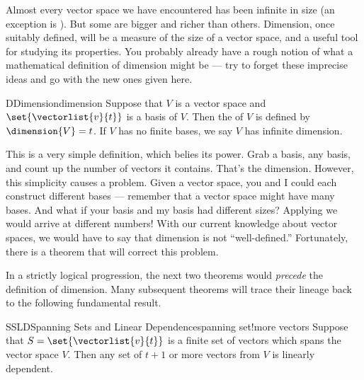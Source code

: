 %
Almost every vector space we have encountered has been infinite in size (an exception is ).  But some are bigger and richer than others.  Dimension, once suitably defined, will be a measure of the size of a vector space, and a useful tool for studying its properties.  You probably already have a rough notion of what a mathematical definition of dimension might be --- try to forget these imprecise ideas and go with the new ones given here.
%
%
%
\begin{definition}{D}{Dimension}{dimension}
Suppose that $V$ is a vector space and $\set{\vectorlist{v}{t}}$ is a basis of $V$.  Then the  of $V$ is defined by $\dimension{V}=t$.  If $V$ has no finite bases, we say $V$ has infinite dimension.
\end{definition}
%
This is a very simple definition, which belies its power.  Grab a basis, any basis, and count up the number of vectors it contains.  That's the dimension.  However, this simplicity causes a problem.  Given a vector space, you and I could each construct different bases --- remember that a vector space might have many bases.  And what if your basis and my basis had different sizes?  Applying  we would arrive at different numbers!  With our current knowledge about vector spaces, we would have to say that dimension is not ``well-defined.''  Fortunately, there is a theorem that will correct this problem.\par
%
In a strictly logical progression, the next two theorems would {\em precede} the definition of dimension.  Many subsequent theorems will trace their lineage back to the following fundamental result.
%
\begin{theorem}{SSLD}{Spanning Sets and Linear Dependence}{spanning set!more vectors}
Suppose that $S=\set{\vectorlist{v}{t}}$ is a finite set of vectors which spans the vector space $V$.  Then any set of $t+1$ or more vectors from $V$ is linearly dependent.
\end{theorem}
%
